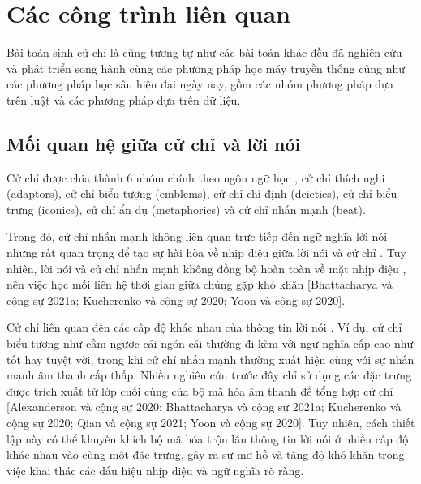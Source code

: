 \chapter{Các công trình liên quan}
\label{Chapter2}


Bài toán sinh cử chỉ là cũng tương tự như các bài toán khác đều đã nghiên cứu và phát triển song hành cùng các phương pháp học máy truyền thống cũng như các phương pháp học sâu hiện đại ngày nay, gồm các nhóm phương pháp dựa trên luật và các phương pháp dựa trên dữ liệu.


\section{Mối quan hệ giữa cử chỉ và lời nói}

Cử chỉ được chia thành 6 nhóm chính theo ngôn ngữ  học \cite{ekman1969repertoire}, \cite{sebeok2011advances} cử chỉ thích nghi (adaptors), cử chỉ biểu tượng (emblems), cử chỉ chỉ định (deictics), cử chỉ biểu trưng (iconics), cử chỉ ẩn dụ (metaphorics) và cử chỉ nhấn mạnh (beat).

 Trong đó, cử chỉ nhấn mạnh không liên quan trực tiếp đến ngữ nghĩa lời nói \cite{kipp2005gesture} nhưng rất quan trọng để tạo sự hài hòa về nhịp điệu giữa lời nói và cử chỉ  \cite{sebeok2011advances} . Tuy nhiên, lời nói và cử chỉ nhấn mạnh không đồng bộ hoàn toàn về mặt nhịp điệu \cite{mcclave1994gestural}, nên việc học mối liên hệ thời gian giữa chúng gặp khó khăn [Bhattacharya và cộng sự 2021a; Kucherenko và cộng sự 2020; Yoon và cộng sự 2020].

Cử chỉ liên quan đến các cấp độ khác nhau của thông tin lời nói \cite{sebeok2011advances}. Ví dụ, cử chỉ biểu tượng như cầm ngược cái ngón cái thường đi kèm với ngữ nghĩa cấp cao như tốt hay tuyệt vời, trong khi cử chỉ nhấn mạnh thường xuất hiện cùng với sự nhấn mạnh âm thanh cấp thấp. Nhiều nghiên cứu trước đây chỉ sử dụng các đặc trưng được trích xuất từ lớp cuối cùng của bộ mã hóa âm thanh để tổng hợp cử chỉ [Alexanderson và cộng sự 2020; Bhattacharya và cộng sự 2021a; Kucherenko và cộng sự 2020; Qian và cộng sự 2021; Yoon và cộng sự 2020]. Tuy nhiên, cách thiết lập này có thể khuyến khích bộ mã hóa trộn lẫn thông tin lời nói ở nhiều cấp độ khác nhau vào cùng một đặc trưng, gây ra sự mơ hồ và tăng độ khó khăn trong việc khai thác các dấu hiệu nhịp điệu và ngữ nghĩa rõ ràng.

